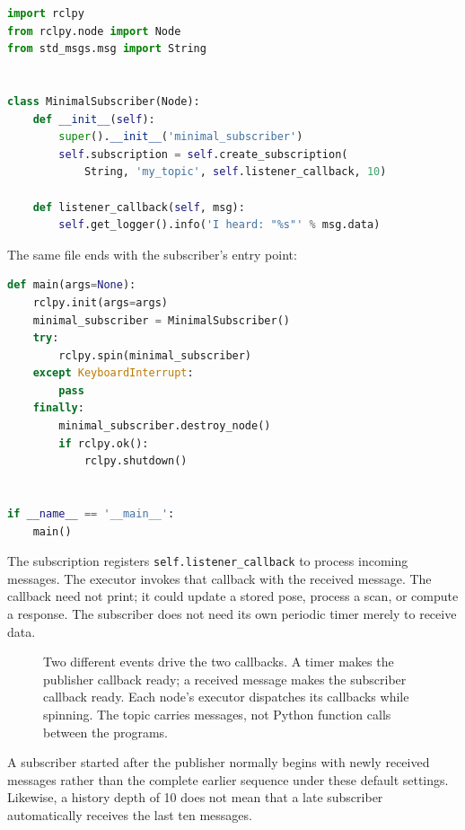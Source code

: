 \begin{lstlisting}[style=robotcode,language=Python]
import rclpy
from rclpy.node import Node
from std_msgs.msg import String


class MinimalSubscriber(Node):
    def __init__(self):
        super().__init__('minimal_subscriber')
        self.subscription = self.create_subscription(
            String, 'my_topic', self.listener_callback, 10)

    def listener_callback(self, msg):
        self.get_logger().info('I heard: "%s"' % msg.data)
\end{lstlisting}

\begin{minipage}{\linewidth}
The same file ends with the subscriber's entry point:
\begin{lstlisting}[style=robotcode,language=Python]
def main(args=None):
    rclpy.init(args=args)
    minimal_subscriber = MinimalSubscriber()
    try:
        rclpy.spin(minimal_subscriber)
    except KeyboardInterrupt:
        pass
    finally:
        minimal_subscriber.destroy_node()
        if rclpy.ok():
            rclpy.shutdown()


if __name__ == '__main__':
    main()
\end{lstlisting}

\end{minipage}

The subscription registers \texttt{self.listener\_callback} to process
incoming messages. The executor
invokes that callback with the received message. The callback need not
print; it could update a stored pose, process a scan, or compute a response.
The subscriber does not need its own periodic timer merely to receive data.

\begin{figure}[htbp]
\centering
\caption{Two different events drive the two callbacks. A timer makes the
publisher callback ready; a received message makes the subscriber callback
ready. Each node's executor dispatches its callbacks while spinning.
The topic carries messages, not Python function calls between the programs.}
\label{fig:l14-pubsub}
\end{figure}

A subscriber started after the publisher normally begins with newly
received messages rather than the complete earlier sequence under these
default settings. Likewise, a history depth of 10 does not mean that a
late subscriber automatically receives the last ten messages.

